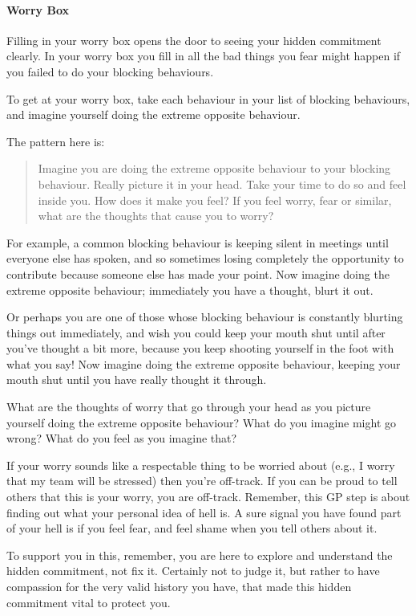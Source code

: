 \paragraph{Worry Box}
Filling in your worry box opens the door to seeing your hidden commitment clearly. In your worry box you fill in all the bad things you fear might happen if you failed to do your blocking behaviours.


To get at your worry box, take each behaviour in your list of blocking behaviours, and imagine yourself doing the extreme opposite behaviour. 


The pattern here is:
\begin{quote} 
Imagine you are doing the extreme opposite behaviour to your blocking behaviour. Really picture it in your head. Take your time to do so and feel inside you. How does it make you feel? If you feel worry, fear or similar, what are the thoughts that cause you to worry?
\end{quote}


For example, a common blocking behaviour is keeping silent in meetings until everyone else has spoken, and so sometimes losing completely the opportunity to contribute because someone else has made your point. Now imagine doing the extreme opposite behaviour; immediately you have a thought, blurt it out.


Or perhaps you are one of those whose blocking behaviour is constantly blurting things out immediately, and wish you could keep your mouth shut until after you've thought a bit more, because you keep shooting yourself in the foot with what you say! Now imagine doing the extreme opposite behaviour, keeping your mouth shut until you have really thought it through. 


What are the thoughts of worry that go through your head as you picture yourself doing the extreme opposite behaviour? What do you imagine might go wrong? What do you feel as you imagine that? 


If your worry sounds like a respectable thing to be worried about (e.g., I worry that my team will be stressed) then you're off-track. If you can be proud to tell others that this is your worry, you are off-track. Remember, this GP step is about finding out what your personal idea of hell is. A sure signal you have found part of your hell is if you feel fear, and feel shame when you tell others about it. 


To support you in this, remember, you are here to explore and understand the hidden commitment, not fix it. Certainly not to judge it, but rather to have compassion for the very valid history you have, that made this hidden commitment vital to protect you. 


